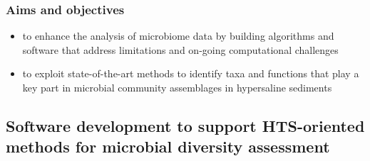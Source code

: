\documentclass{beamer}
\begin{document}
   \begin{frame}
      \frametitle{Aims and objectives}
      \begin{itemize}
         \item \small to enhance the analysis of microbiome data by building algorithms and software
         that address limitations and on-going computational challenges
         \bigskip
         \item  to exploit state-of-the-art methods to identify taxa and functions that play a key
         part in microbial community assemblages in hypersaline sediments
      \end{itemize}

   \end{frame}




   \begin{darkframes}
      \section{
      Software development to support HTS-oriented methods for microbial diversity assessment
      }
   \end{darkframes}
\end{document}
